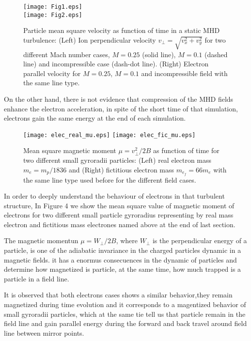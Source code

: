 \documentclass[11pt,twocolumn]{article}
\begin{document}
\begin{figure}[h!]
\begin{center}
{\texttt{[image: Fig1.eps]}}\\
{\texttt{[image: Fig2.eps]}}
\caption{Particle mean square velocity as function of time in a static MHD turbulence: (Left) Ion 
perpendicular velocity $v_\perp = \sqrt{v_x^2 + v_y^2}$ for two different Mach number cases, 
$M=0.25$ (solid line), $M=0.1$ (dashed line) and incompressible case (dash-dot line). (Right) 
Electron parallel velocity for $M=0.25$, $M=0.1$ and incompressible field with the same line type.}
\end{center}
\label{mean square velocity}
\end{figure}

On the other hand, there is not evidence that compression of the MHD fields enhance the electron acceleration, in spite of the short time of that simulation, electrons gain the same energy at the end of each simulation.

\begin{figure}
\begin{center}
{\texttt{[image: elec\_real\_mu.eps]}}
{\texttt{[image: elec\_fic\_mu.eps]}}
\caption{Mean square magnetic moment $\mu = v_{\perp}^2/2B$ as function of time for two different small 
gyroradii particles: (Left) real electron mass $m_e = m_p/1836$ and (Right) fictitious electron mass 
$m_e_f = 66 m_e$ with the same line type used before for the different field cases.}
\end{center}
\label{mean square velocity}
\end{figure}
 
In order to deeply understand the behaviour of electrons in that turbulent structure, In Figure 4 we show the mean square value of magnetic moment of electrons for two different small particle gyroradius representing by real mass electron and fictitious mass electrones named above at the end of last section.

The magnetic momentun $\mu=W_\perp/2B$, where $W_\perp$ is the perpendicular energy of a particle, is one of the adiabatic invariance in the charged particles dynamic in a magnetic fields. it has a enormus consecuences in the dynamic of particles and determine how magnetized is particle, at the same time, how much trapped is a particle in a field line.

It is observed that both electrons cases shows a similar behavior,they remain magnetized during time evolution and it corresponds to a magentized behavior of small gyroradii particles, which at the same tie tell us that particle remain in the field line and gain parallel energy during the forward and back travel around field line between mirror points.
\end{document}
